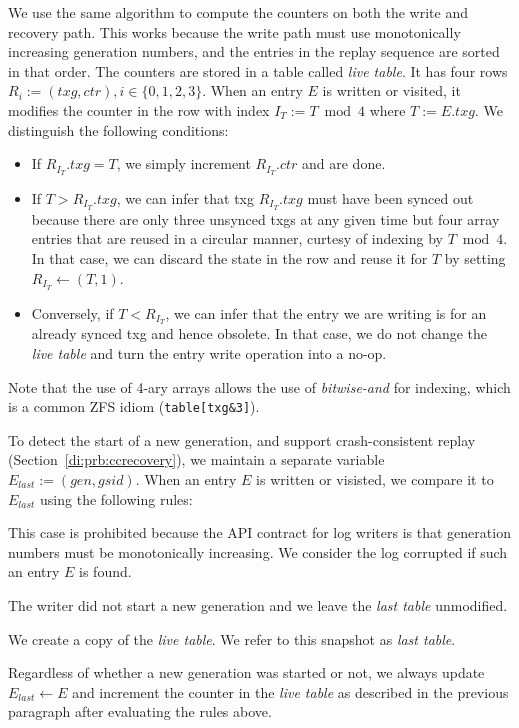 \documentclass[12pt,a4paper,twoside]{book}
\begin{document}
We use the same algorithm to compute the counters on both the write and recovery path.
This works because the write path must use monotonically increasing generation numbers, and the entries in the replay sequence are sorted in that order.
The counters are stored in a table called \textit{live table}.
It has four rows $R_i := (txg, ctr), i \in \{0,1,2,3\}$.
When an entry $E$ is written or visited, it modifies the counter in the row with index $I_T := T \bmod 4$ where $T := E.txg$.
We distinguish the following conditions:
\begin{itemize}[noitemsep]
\item If $R_{I_T}.txg = T$, we simply increment $R_{I_T}.ctr$ and are done.
\item If $T > R_{I_T}.txg$, we can infer that txg $R_{I_T}.txg$ must have been synced out because there are only three unsynced txgs at any given time but four array entries that are reused in a circular manner, curtesy of indexing by $T \bmod 4$.
In that case, we can discard the state in the row and reuse it for $T$ by setting $R_{I_T} \leftarrow (T, 1)$.
\item Conversely, if $T < R_{I_T}$, we can infer that the entry we are writing is for an already synced txg and hence obsolete.
In that case, we do not change the \textit{live table} and turn the entry write operation into a no-op.
\end{itemize}
Note that the use of 4-ary arrays allows the use of \textit{bitwise-and} for indexing, which is a common ZFS idiom (\lstinline{table[txg&3]}).

To detect the start of a new generation, and support crash-consistent replay (Section~\ref{di:prb:ccrecovery}), we maintain a separate variable $E_{last} := (gen, gsid)$.
When an entry $E$ is written or visisted, we compare it to $E_{last}$ using the following rules:
\begin{description}[noitemsep,leftmargin=1.5cm,labelindent=1cm]
\item[$E < E_{last}$] This case is prohibited because the API contract for log writers is that generation numbers must be monotonically increasing.
We consider the log corrupted if such an entry $E$ is found.
\item[$E.gen = E_{last}.gen$] The writer did not start a new generation and we leave the \textit{last table} unmodified.
\item[$E.gen > E_{last}.gen$] We create a copy of the \textit{live table}. We refer to this snapshot as \textit{last table}.
\end{description}
Regardless of whether a new generation was started or not, we always update $E_{last} \leftarrow E$ and increment the counter in the \textit{live table} as described in the previous paragraph after evaluating the rules above.
\end{document}
